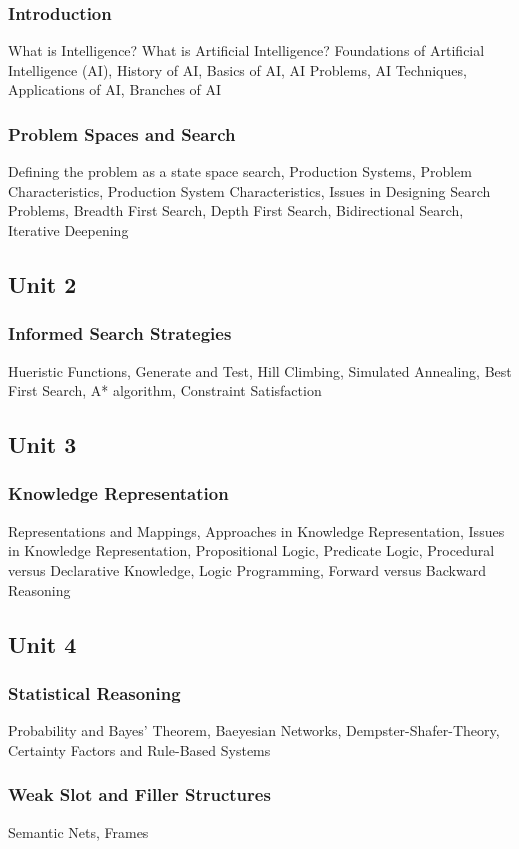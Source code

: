 \documentclass{article}
\begin{document}
\begin{multicols*}{2}
    \subsubsection*{Introduction}
    What is Intelligence? What is Artificial Intelligence? Foundations of Artificial Intelligence (AI), History of AI, Basics of AI, AI Problems, AI Techniques, Applications of AI, Branches of AI
    \subsubsection*{Problem Spaces and Search}
    Defining the problem as a state space search, Production Systems, Problem Characteristics, Production System Characteristics, Issues in Designing Search Problems, Breadth First Search, Depth First Search, Bidirectional Search, Iterative Deepening
    \subsection*{Unit 2}
    \subsubsection*{Informed Search Strategies}
    Hueristic Functions, Generate and Test, Hill Climbing, Simulated Annealing, Best First Search, A* algorithm, Constraint Satisfaction
    \subsection*{Unit 3}
    \subsubsection*{Knowledge Representation}
    Representations and Mappings, Approaches in Knowledge Representation, Issues in Knowledge Representation, Propositional Logic, Predicate Logic, Procedural versus Declarative Knowledge, Logic Programming, Forward versus Backward Reasoning
    \subsection*{Unit 4}
    \subsubsection*{Statistical Reasoning}
    Probability and Bayes' Theorem, Baeyesian Networks, Dempster-Shafer-Theory, Certainty Factors and Rule-Based Systems
    \subsubsection*{Weak Slot and Filler Structures}
    Semantic Nets, Frames

\end{multicols*}
\end{document}

